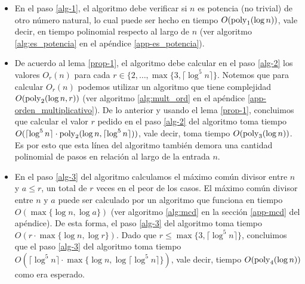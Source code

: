 \documentclass[10pt]{article}
\newcommand{\0}{\mathbf{0}}
\newcommand{\1}{\mathbf{1}}
\newcommand{\poly}{{\rm poly}}
\newcommand{\+}{\oplus}
\newcommand{\comentario}[1]{}
\newcommand{\comentarioin}[1]{}
\theoremstyle{remark}
\theoremstyle{remark}
\begin{document}
	\begin{itemize}
	\item En el paso \ref{alg-1}, el algoritmo debe verificar si $n$ es potencia (no trivial) de otro número natural, lo cual puede ser hecho en tiempo $O(\poly_1(\log n))$, vale decir, en tiempo polinomial respecto al largo de $n$ (ver algoritmo \ref{alg:es_potencia} 
	en el apéndice \ref{app-es_potencia}).
	
	\item De acuerdo al lema \ref{prop-1}, el algoritmo debe calcular en el paso \ref{alg-2} los valores $O_r(n)$ para cada $r \in \{2, \ldots, \max\{3,\lceil \log^5 n\rceil\}$. Notemos que para calcular $O_r(n)$ podemos utilizar un algoritmo  que tiene complejidad $O(\poly_2(\log n, r))$ (ver algoritmo \ref{alg:mult_ord} en el apéndice \ref{app-orden_multiplicativo}).
	De lo anterior y usando el lema \ref{prop-1}, concluimos que calcular el valor $r$ pedido en el paso \ref{alg-2} del algoritmo toma tiempo $O(\lceil \log^5 n\rceil \cdot \poly_2(\log n, \lceil \log^5 n\rceil))$, vale decir, toma tiempo $O(\poly_3(\log n))$. 
	Es por esto que esta línea del algoritmo también demora una cantidad polinomial de pasos en relación al largo de la entrada $n$.
	
	\item En el paso \ref{alg-3} del algoritmo calculamos el máximo común divisor entre $n$ y $a\leq r$, un total de $r$ veces en el peor de los casos. El máximo común divisor entre $n$ y $a$ puede ser calculado por un algoritmo que funciona en tiempo $O(\max\{\log n, \log a\})$ (ver algoritmo \ref{alg:mcd} en la sección \ref{app-mcd} del apéndice). De esta forma, el paso \ref{alg-3} del algoritmo toma tiempo $O(r \cdot \max\{\log n, \log r\})$. Dado que $r\leq \max\{3,\lceil \log ^5 n\rceil\}$, concluimos que el paso \ref{alg-3} del algoritmo toma tiempo $O(\lceil \log ^5 n\rceil \cdot \max\{\log n, \log \lceil \log ^5 n\rceil\})$, vale decir, tiempo $O(\poly_4(\log n))$ como era esperado. 
	

\end{itemize}
\end{document}
